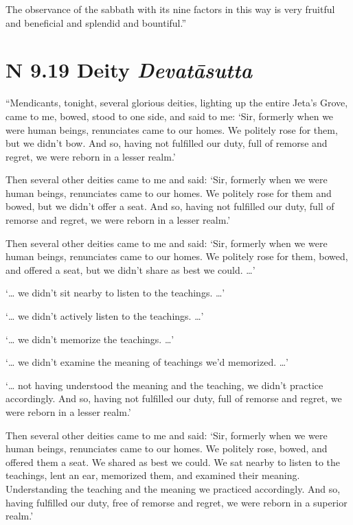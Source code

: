 \documentclass[12pt,openany]{book}%
\newcommand*{\suttatitleacronym}[1]{\smaller[2]{#1}\vspace*{.3em}}
\newcommand*{\suttatitletranslation}[1]{\linebreak{#1}}
\newcommand*{\suttatitleroot}[1]{\linebreak\smaller[2]\itshape{#1}}
\newcommand*{\tocacronym}[1]{\hspace*{-3.3em}{#1}\quad}
\newcommand*{\toctranslation}[1]{#1}
\newcommand*{\tocroot}[1]{(\textit{#1})}
\begin{document}
The observance of the sabbath with its nine factors in this way is very fruitful and beneficial and splendid and bountiful.” 

%
\section*{{\suttatitleacronym AN 9.19}{\suttatitletranslation A Deity }{\suttatitleroot Devatāsutta}}
\addcontentsline{toc}{section}{\tocacronym{AN 9.19} \toctranslation{A Deity } \tocroot{Devatāsutta}}

“Mendicants, tonight, several glorious deities, lighting up the entire Jeta’s Grove, came to me, bowed, stood to one side, and said to me: ‘Sir, formerly when we were human beings, renunciates came to our homes. We politely rose for them, but we didn’t bow. And so, having not fulfilled our duty, full of remorse and regret, we were reborn in a lesser realm.’ 

Then several other deities came to me and said: ‘Sir, formerly when we were human beings, renunciates came to our homes. We politely rose for them and bowed, but we didn’t offer a seat. And so, having not fulfilled our duty, full of remorse and regret, we were reborn in a lesser realm.’ 

Then several other deities came to me and said: ‘Sir, formerly when we were human beings, renunciates came to our homes. We politely rose for them, bowed, and offered a seat, but we didn’t share as best we could. …’ 

‘… we didn’t sit nearby to listen to the teachings. …’ 

‘… we didn’t actively listen to the teachings. …’ 

‘… we didn’t memorize the teachings. …’ 

‘… we didn’t examine the meaning of teachings we’d memorized. …’ 

‘… not having understood the meaning and the teaching, we didn’t practice accordingly. And so, having not fulfilled our duty, full of remorse and regret, we were reborn in a lesser realm.’ 

Then several other deities came to me and said: ‘Sir, formerly when we were human beings, renunciates came to our homes. We politely rose, bowed, and offered them a seat. We shared as best we could. We sat nearby to listen to the teachings, lent an ear, memorized them, and examined their meaning. Understanding the teaching and the meaning we practiced accordingly. And so, having fulfilled our duty, free of remorse and regret, we were reborn in a superior realm.’ 
\end{document}
